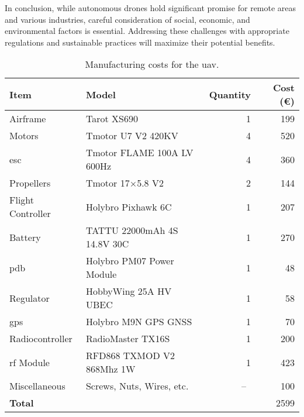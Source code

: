 In conclusion, while autonomous drones hold significant promise for remote areas and various industries, careful consideration of social, economic, and environmental factors is essential. Addressing these challenges with appropriate regulations and sustainable practices will maximize their potential benefits.

\begin{table}[H]
  \begin{tabular}{ l l r r }
    \toprule
    \textbf{Item} & \textbf{Model} & \textbf{Quantity} & \textbf{Cost (\euro)} \\
    \midrule
    Airframe & Tarot XS690 \autocite{rcinnovationsQuadPlegable} & 1 & 199 \\
    Motors & Tmotor U7 V2 420KV \autocite{rcinnovationsTmotor420KV} & 4 & 520 \\
    \gls{esc} & Tmotor FLAME 100A LV 600Hz \autocite{rcinnovationsVariadorTmotor} & 4 & 360 \\
    Propellers & Tmotor 17$\times$5.8 V2 \autocite{rcinnovationsTmotor17x58} & 2 & 144 \\
    Flight Controller & Holybro Pixhawk 6C \autocite{rcinnovationsPixhawkCarcasa} & 1 & 207 \\
    Battery & TATTU 22000mAh 4S 14.8V 30C \autocite{rcinnovationsComprarBatera}  & 1 & 270 \\
    \gls{pdb} & Holybro PM07 Power Module \autocite{rcinnovationsHolybroPM07} & 1 & 48 \\
    Regulator & HobbyWing 25A HV UBEC \autocite{rcinnovationsHobbyWingUbec} & 1 & 58 \\
    \gls{gps} & Holybro M9N GPS GNSS \autocite{rcinnovationsHolybroGNSS} & 1 & 70 \\
    Radiocontroller & RadioMaster TX16S \autocite{rcinnovationsRadioMasterTX16S} & 1 & 200 \\
    \gls{rf} Module & RFD868 TXMOD V2 868Mhz 1W \autocite{rcinnovationsComprarMdulos} & 1 & 423 \\
    Miscellaneous & Screws, Nuts, Wires, etc. &~--~& 100 \\
    \midrule
    \textbf{Total} & & & 2599 \\
    \bottomrule
  \end{tabular}
  \caption{Manufacturing costs for the \gls{uav}.}\label{tab:manufacturing_costs_uav}
\end{table}

